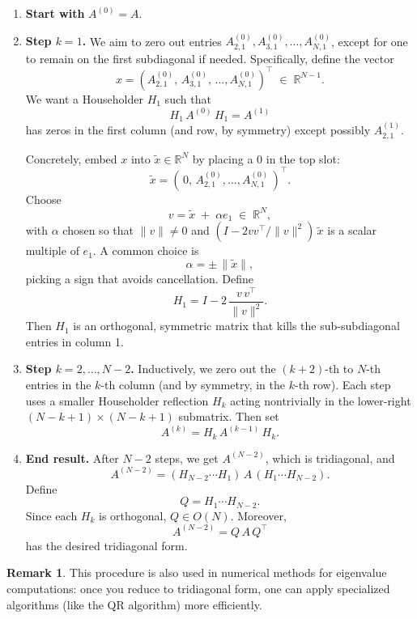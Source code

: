 \documentclass[letterpaper,11pt,oneside,reqno]{article}
\numberwithin{equation}{section}
\theoremstyle{definition}
\newtheorem{remark}[proposition]{Remark}
\begin{document}
\begin{enumerate}[1.]
\item \textbf{Start with } \(A^{(0)}=A\).
\item \textbf{Step \(k=1\).}
   We aim to zero out entries \(A^{(0)}_{2,1},A^{(0)}_{3,1},\ldots,A^{(0)}_{N,1}\), except for one to remain on the first subdiagonal if needed. Specifically, define the vector
   \[
     x
     = (A^{(0)}_{2,1},\,A^{(0)}_{3,1},\,\dots,A^{(0)}_{N,1})^\top
     \;\in\;\mathbb{R}^{N-1}.
   \]
   We want a Householder \(H_1\) such that
   \[
     H_1\,A^{(0)}\,H_1
     = A^{(1)}
   \]
   has zeros in the first column (and row, by symmetry) except possibly \(A^{(1)}_{2,1}\).

   Concretely, embed \(x\) into \(\tilde x \in \mathbb{R}^N\) by placing a \(0\) in the top slot:
   \[
     \tilde x = (\,0,\, A^{(0)}_{2,1},\ldots,A^{(0)}_{N,1}\,)^\top.
   \]
   Choose
   \[
     v = \tilde x \;+\;\alpha e_1
     \;\in\;\mathbb{R}^N,
   \]
   with \(\alpha\) chosen so that
   \(\|v\|\neq 0\) and \((I - 2vv^\top/\|v\|^2)\,\tilde x\) is a scalar multiple of \(e_1\).  A common choice is
   \[
     \alpha = \pm\,\|\tilde x\|,
   \]
   picking a sign that avoids cancellation.  Define
   \[
     H_1 = I - 2 \,\frac{v\,v^\top}{\|v\|^2}.
   \]
   Then \(H_1\) is an orthogonal, symmetric matrix that kills the sub-subdiagonal entries in column 1.
\item \textbf{Step \(k=2,\dots,N-2\).}
   Inductively, we zero out the \((k+2)\)-th to \(N\)-th entries in the \(k\)-th column (and by symmetry, in the \(k\)-th row).  Each step uses a smaller Householder reflection \(H_k\) acting nontrivially in the lower-right \((N-k+1)\times(N-k+1)\) submatrix.  Then set
   \[
     A^{(k)} = H_k\,A^{(k-1)}\,H_k.
   \]
\item \textbf{End result.}
   After \(N-2\) steps, we get \(A^{(N-2)}\), which is tridiagonal, and
   \[
     A^{(N-2)}
     = (H_{N-2}\cdots H_1)\,A\,(H_1\cdots H_{N-2}).
   \]
   Define
   \[
     Q = H_1 \cdots H_{N-2}.
   \]
   Since each \(H_k\) is orthogonal, \(Q\in O(N)\). Moreover,
   \[
     A^{(N-2)} = Q\,A\,Q^\top
   \]
   has the desired tridiagonal form.
\end{enumerate}

\begin{remark}
This procedure is also used in numerical methods for eigenvalue computations: once you reduce to tridiagonal form, one can apply specialized algorithms (like the QR algorithm) more efficiently.
\end{remark}
\end{document}
